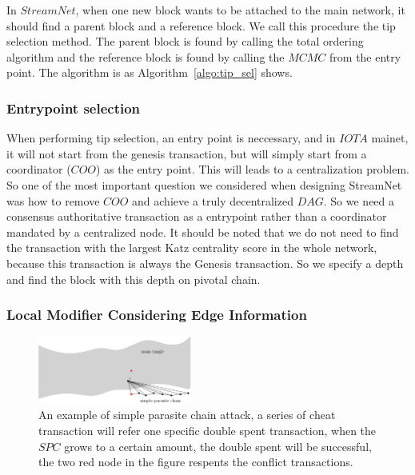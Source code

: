 In $StreamNet$, when one new block wants to be attached to the main network, it should find a parent block and a reference block. We call this procedure the tip selection method. 
The parent block is found by calling the total ordering algorithm and the reference block is found by calling the $MCMC$ from the entry point. The algorithm is as Algorithm~\ref{algo:tip_sel} shows.



\subsubsection{Entrypoint selection}
When performing tip selection, an entry point is neccessary, and in $IOTA$ mainet, it will not start from the genesis transaction,
but will simply start from a coordinator ($COO$) as the entry point.
This will leads to a centralization problem. 
So one of the most important question we considered when designing StreamNet was how to remove $COO$ and achieve a truly decentralized $DAG$. 
So we need a consensus authoritative transaction as a entrypoint rather than a coordinator mandated by a centralized node.
It should be noted that we do not need to find the transaction with the largest Katz centrality score in the whole network,
because this transaction is always the Genesis transaction.
So we specify a depth and find the block with this depth on pivotal chain.

\subsubsection{Local Modifier Considering Edge Information}

\begin{figure}[!ht]
\begin{center}
\includegraphics[width=0.45\textwidth]{figures/spc.png}
    \caption{
        An example of simple parasite chain attack, a series of cheat transaction will refer one specific double spent transaction, 
        when the $SPC$ grows to a certain amount, the double spent will be successful, the two red node in the figure respents the 
        conflict transactions.
     }
\label{spc}
\end{center}
\end{figure}



